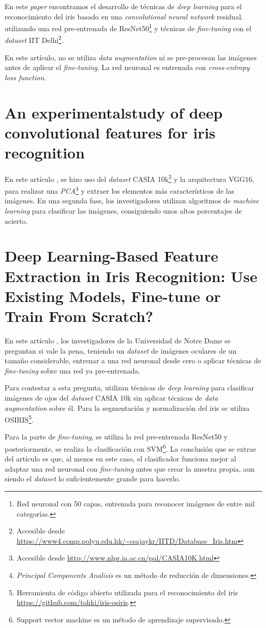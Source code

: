 En este \textit{paper} \cite{minaee_deepiris_2019} encontramos el desarrollo de técnicas de \textit{deep learning} para el reconocimiento del iris basado en una \textit{convolutional neural network} residual. utilizando una red pre-entrenada 
de ResNet50\footnote{Red neuronal con 50 capas, entrenada para reconocer imágenes de entre mil categorías.} y técnicas de \textit{fine-tuning} con el \textit{dataset} IIT Delhi\footnote{Accesible desde \url{https://www4.comp.polyu.edu.hk/~csajaykr/IITD/Database_Iris.htm}}. 

En este artículo, no se utiliza \textit{data augmentation} ni se pre-procesan las imágenes antes de aplicar el \textit{fine-tuning}. La red neuronal es entrenada con \textit{cross-entropy loss function}. 

\section{ An experimentalstudy of deep convolutional features for iris recognition}

En este artículo \cite{minaee_experimental_2017}, se hizo uso del \textit{dataset} CASIA 10k\footnote{Accesible desde \url{http://www.nlpr.ia.ac.cn/pal/CASIA10K.html}} y la arquitectura VGG16, para realizar una \textit{PCA}\footnote{\textit{Principal Components Analisis} es un método de reducción de dimensiones.} y extraer los elementos
más característicos de las imágenes. En una segunda fase, los investigadores utilizan algoritmos de \textit{machine learning} para clasificar las imágenes, consiguiendo unos altos porcentajes de acierto.

\section{Deep Learning-Based Feature Extraction in Iris Recognition: Use Existing Models, Fine-tune or Train From Scratch?}


En este artículo \cite{boyd_deep_2020}, los investigadores de la Universidad de Notre Dame se preguntan si vale la pena, teniendo un \textit{dataset} de imágenes oculares de un tamaño considerable,
entrenar a una red neuronal desde cero o aplicar técnicas de \textit{fine-tuning} sobre una red ya pre-entrenada.

Para contestar a esta pregunta, utilizan técnicas de \textit{deep learning} para clasificar imágenes de ojos del \textit{dataset} CASIA 10k sin aplicar técnicas de \textit{data augmentation} sobre él. 
Para la segmentación y normalización del iris se utiliza OSIRIS\footnote{Herramienta de código abierto utilizada para el reconocimiento del iris \url{https://github.com/tohki/iris-osiris}.}.

Para la parte de \textit{fine-tuning}, se utiliza la red pre-entrenada ResNet50 y posteriormente, se realiza la clasificación con SVM\footnote{Support vector machine es un método de aprendizaje supervisado.}.
La conclusión que se extrae del artículo es que, al menos en este caso, el clasificador funciona mejor al adaptar una red neuronal con \textit{fine-tuning} antes que crear la nuestra propia, aun siendo el 
\textit{dataset} lo suficientemente grande para hacerlo.
